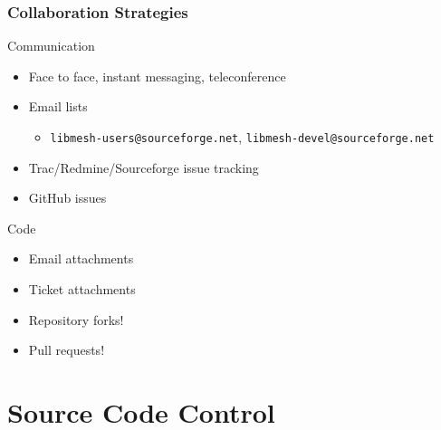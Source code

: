 \documentclass[mathserif]{beamer}
\newcommand{\libMesh}{\texttt{libMesh}\xspace}
\begin{document}
\begin{frame}
\frametitle{Collaboration Strategies}

\begin{block}{Communication}
\begin{itemize}
	\item Face to face, instant messaging, teleconference
	\item Email lists
	\begin{itemize}
		\item \texttt{libmesh-users@sourceforge.net},
			\texttt{libmesh-devel@sourceforge.net}
	\end{itemize}
	\item Trac/Redmine/Sourceforge issue tracking
	\item GitHub issues
\end{itemize}
\end{block}

\begin{block}{Code}
\begin{itemize}
	\item Email attachments
	\item Ticket attachments
		\item Repository forks!
		\item Pull requests!
\end{itemize}
\end{block}

\end{frame}



\section{Source Code Control}

\end{document}
